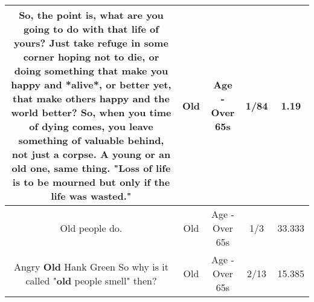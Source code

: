 \documentclass[11pt]{article}
\newlength\mylength
\begin{document}
\begin{center}
\begin{longtable}{|C{.65\mylength}|C{.30\mylength}|C{.12\mylength}|C{.12\mylength}|C{.12\mylength}|}
  \small So, the point is, what are you going to do with that life of yours? Just take refuge in some corner hoping not to die, or doing something that make you happy and *alive*, or better yet, that make others happy and the world better? So, when you time of dying comes, you leave something of valuable behind, not just a corpse. A young or an \textbf{old} one, same thing. "Loss of life is to be mourned but only if the life was wasted."\normalsize   & Old & Age - Over 65s & 1/84 & 1.19 \\  \hline
  \small Old people do.\normalsize   & Old & Age - Over 65s & 1/3 & 33.333 \\  \hline
  \small Angry \textbf{Old} Hank Green So why is it called "\textbf{old} people smell" then?\normalsize   & Old & Age - Over 65s & 2/13 & 15.385 \\  \hline
  
\end{longtable}
\end{center}
\end{document}
